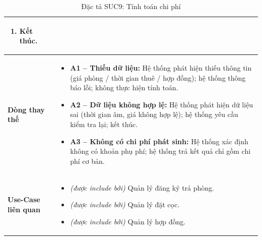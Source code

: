 \begin{table}[H]
\begin{tabularx}{\textwidth}{|>{\centering\arraybackslash\bfseries}m{3.5cm}|X|}
\begin{enumerate}[leftmargin=*, nosep]
        \item Kết thúc.
    \end{enumerate} \\
    \hline
    Dòng thay thế &
    \begin{itemize}[leftmargin=*, nosep, label=-]
        \vspace{0.1cm}
        \item \textbf{A1 -- Thiếu dữ liệu:} Hệ thống phát hiện thiếu thông tin (giá phòng / thời gian thuê / hợp đồng); hệ thống thông báo lỗi; không thực hiện tính toán.
        \item \textbf{A2 -- Dữ liệu không hợp lệ:} Hệ thống phát hiện dữ liệu sai (thời gian âm, giá không hợp lệ); hệ thống yêu cầu kiểm tra lại; kết thúc.
        \item \textbf{A3 -- Không có chi phí phát sinh:} Hệ thống xác định không có khoản phụ phí; hệ thống trả kết quả chỉ gồm chi phí cơ bản.
    \end{itemize} \\
    \hline
    Use-Case liên quan &
    \begin{itemize}[leftmargin=*, nosep, label=-]
        \vspace{0.1cm}
        \item \textit{(được include bởi)} Quản lý đăng ký trả phòng.
        \item \textit{(được include bởi)} Quản lý đặt cọc.
        \item \textit{(được include bởi)} Quản lý hợp đồng.
\end{itemize} \\
    \hline
\end{tabularx}
\caption{Đặc tả SUC9: Tính toán chi phí}
\end{table}


\vspace{1cm}

